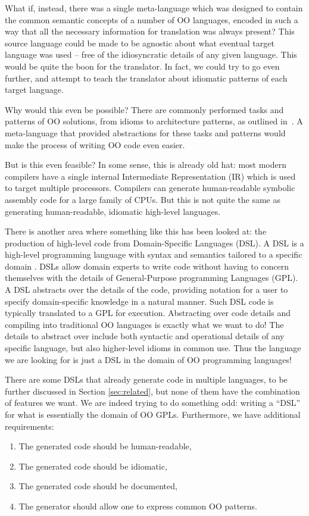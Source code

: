 \documentclass[sigplan,review,anonymous,prologue,dvipsnames]{acmart}
\begin{document}
What if, instead, there was a single meta-language which was designed to
contain the common semantic concepts of a number of OO languages, encoded
in such a way that all the necessary information for translation was always
present?  This source language could be made to be agnostic about what
eventual target language was used -- free of the idiosyncratic details of
any given language.  This would be quite the boon for the translator.
In fact, we could try to go even further, and attempt to teach the translator
about idiomatic patterns of each target language.

Why would this even be possible? There are commonly performed tasks and
patterns of OO solutions, from idioms to architecture patterns, as outlined
in~\cite{gamma1995design}. A meta-language 
that provided abstractions for these tasks and patterns would make the process 
of writing OO code even easier.

But is this even feasible? In some sense, this is already old hat: most
modern compilers have a single internal Intermediate Representation (IR)
which is used to target multiple processors. Compilers can generate
human-readable symbolic assembly code for a large family of CPUs. But this
is not quite the same as generating human-readable, idiomatic high-level
languages.

There is another area where something like this has been looked at:
the production of high-level code from Domain-Specific Languages (DSL).
A DSL is a high-level programming language with syntax and semantics tailored
to a specific domain \cite{mernik2005and}. DSLs allow domain experts 
to write code without having to concern themselves with the details of
General-Purpose programming Languages (GPL). A DSL
abstracts over the details of the code, providing notation for a user to
specify domain-specific knowledge in a natural manner. Such DSL code is typically
translated to a GPL for execution. Abstracting over code details
and compiling into traditional OO languages is exactly what we want to do!
The details to abstract over include both syntactic and operational details of
any specific language, but also higher-level idioms in common use.  Thus
the language we are looking for
is just a DSL in the domain of OO programming languages!

There are some DSLs that already generate code in multiple languages, to be
further discussed in Section \ref{sec:related}, but none of them have the 
combination of features we want. We are indeed trying to do something odd:
writing a ``DSL'' for what is essentially the domain of OO GPLs. Furthermore,
we have additional requirements:
\begin{enumerate}
\item The generated code should be human-readable,
\item The generated code should be idiomatic,
\item The generated code should be documented,
\item The generator should allow one to express common OO patterns.
\end{enumerate}
\end{document}

